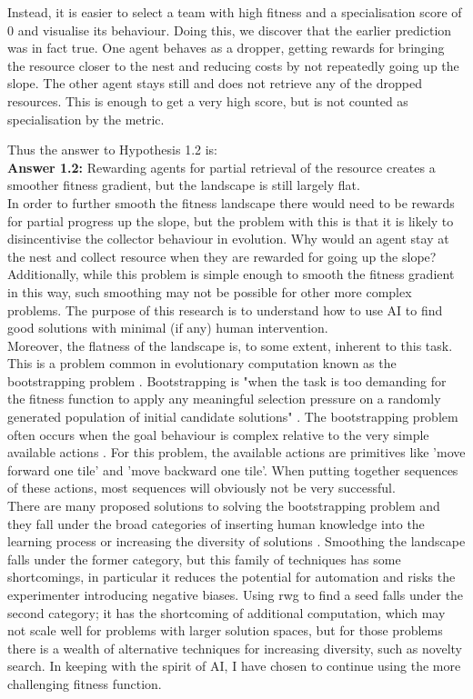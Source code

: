\documentclass[12pt]{article}
\begin{document}
Instead, it is easier to select a team with high fitness and a specialisation score of 0 and visualise its behaviour.
Doing this, we discover that the earlier prediction was in fact true.
One agent behaves as a dropper, getting rewards for bringing the resource closer to the nest and reducing costs by not repeatedly going up the slope.
The other agent stays still and does not retrieve any of the dropped resources.
This is enough to get a very high score, but is not counted as specialisation by the metric.

Thus the answer to Hypothesis 1.2 is:\\

\textbf{Answer 1.2:} Rewarding agents for partial retrieval of the resource creates a smoother fitness gradient, but the landscape is still largely flat.\\

In order to further smooth the fitness landscape there would need to be rewards for partial progress up the slope, but the problem with this is that it is likely to disincentivise the collector behaviour in evolution.
Why would an agent stay at the nest and collect resource when they are rewarded for going up the slope? 
Additionally, while this problem is simple enough to smooth the fitness gradient in this way, such smoothing may not be possible for other more complex problems.
The purpose of this research is to understand how to use AI to find good solutions with minimal (if any) human intervention.\\

Moreover, the flatness of the landscape is, to some extent, inherent to this task.
This is a problem common in evolutionary computation known as the bootstrapping problem \cite{Silva:EC:2016, Wei:ALR:2019}.
Bootstrapping is "when the task is too demanding for the fitness function to apply any meaningful selection pressure on a randomly generated population of initial candidate solutions" \cite{Silva:EC:2016}.
The bootstrapping problem often occurs when the goal behaviour is complex relative to the very simple available actions \cite{Wei:ALR:2019}.
For this problem, the available actions are primitives like 'move forward one tile' and 'move backward one tile'.
When putting together sequences of these actions, most sequences will obviously not be very successful.\\

There are many proposed solutions to solving the bootstrapping problem and they fall under the broad categories of inserting human knowledge into the learning process or increasing the diversity of solutions \cite{Silva:EC:2016}.
Smoothing the landscape falls under the former category, but this family of techniques has some shortcomings, in particular it reduces the potential for automation and risks the experimenter introducing negative biases.
Using rwg to find a seed falls under the second category; it has the shortcoming of additional computation, which may not scale well for problems with larger solution spaces, but for those problems there is a wealth of alternative techniques for increasing diversity, such as novelty search.
In keeping with the spirit of AI, I have chosen to continue using the more challenging fitness function.
\end{document}
